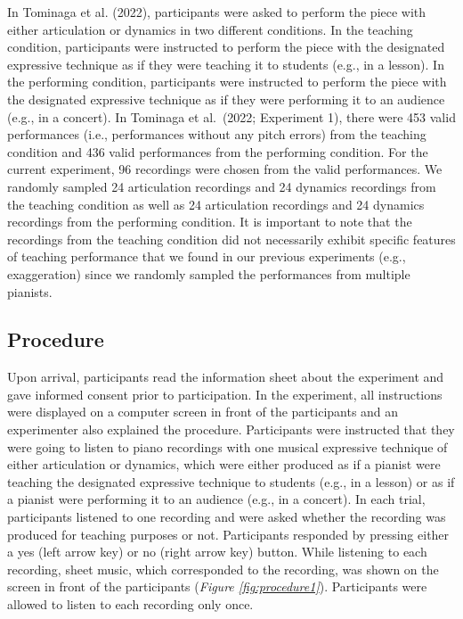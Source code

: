 \documentclass[
  man,floatsintext]{apa6}
\begin{document}
In Tominaga et al. (2022), participants were asked to perform the piece with either articulation or dynamics in two different conditions. In the teaching condition, participants were instructed to perform the piece with the designated expressive technique as if they were teaching it to students (e.g., in a lesson). In the performing condition, participants were instructed to perform the piece with the designated expressive technique as if they were performing it to an audience (e.g., in a concert). In Tominaga et al.~(2022; Experiment 1), there were 453 valid performances (i.e., performances without any pitch errors) from the teaching condition and 436 valid performances from the performing condition. For the current experiment, 96 recordings were chosen from the valid performances. We randomly sampled 24 articulation recordings and 24 dynamics recordings from the teaching condition as well as 24 articulation recordings and 24 dynamics recordings from the performing condition. It is important to note that the recordings from the teaching condition did not necessarily exhibit specific features of teaching performance that we found in our previous experiments (e.g., exaggeration) since we randomly sampled the performances from multiple pianists.

\hypertarget{procedure}{%
\subsection{Procedure}\label{procedure}}

Upon arrival, participants read the information sheet about the experiment and gave informed consent prior to participation. In the experiment, all instructions were displayed on a computer screen in front of the participants and an experimenter also explained the procedure. Participants were instructed that they were going to listen to piano recordings with one musical expressive technique of either articulation or dynamics, which were either produced as if a pianist were teaching the designated expressive technique to students (e.g., in a lesson) or as if a pianist were performing it to an audience (e.g., in a concert). In each trial, participants listened to one recording and were asked whether the recording was produced for teaching purposes or not. Participants responded by pressing either a yes (left arrow key) or no (right arrow key) button. While listening to each recording, sheet music, which corresponded to the recording, was shown on the screen in front of the participants (\emph{Figure \ref{fig:procedure1}}). Participants were allowed to listen to each recording only once.
\end{document}
